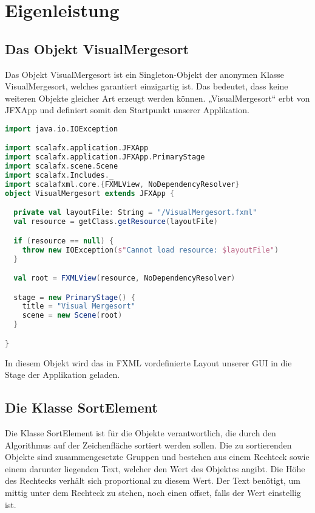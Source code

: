 
\chapter{Eigenleistung}\label{chap:eigenleistung}

\section{Das Objekt VisualMergesort}
Das Objekt VisualMergesort ist ein Singleton-Objekt der anonymen Klasse VisualMergesort, welches garantiert einzigartig ist. Das bedeutet, dass keine weiteren Objekte gleicher Art erzeugt werden können. „VisualMergesort“ erbt von JFXApp und definiert somit den Startpunkt unserer Applikation.

\begin{lstlisting}[language=Scala]
import java.io.IOException

import scalafx.application.JFXApp
import scalafx.application.JFXApp.PrimaryStage
import scalafx.scene.Scene
import scalafx.Includes._
import scalafxml.core.{FXMLView, NoDependencyResolver}
object VisualMergesort extends JFXApp {

  private val layoutFile: String = "/VisualMergesort.fxml"
  val resource = getClass.getResource(layoutFile)

  if (resource == null) {
    throw new IOException(s"Cannot load resource: $layoutFile")
  }

  val root = FXMLView(resource, NoDependencyResolver)

  stage = new PrimaryStage() {
    title = "Visual Mergesort"
    scene = new Scene(root)
  }

}
\end{lstlisting}

In diesem Objekt wird das in FXML vordefinierte Layout unserer GUI in die Stage der Applikation geladen.

\section{Die Klasse SortElement}
Die Klasse SortElement ist für die Objekte verantwortlich, die durch den Algorithmus auf der Zeichenfläche sortiert werden sollen. Die zu sortierenden Objekte sind zusammengesetzte Gruppen und bestehen aus einem Rechteck sowie einem darunter liegenden Text, welcher den Wert des Objektes angibt. Die Höhe des Rechtecks verhält sich proportional zu diesem Wert.
Der Text benötigt, um mittig unter dem Rechteck zu stehen, noch einen offset, falls der Wert einstellig ist.


